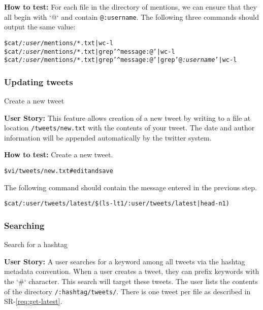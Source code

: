 \begin{Requirements}
\textbf{How to test:} For each file in the directory of mentions, we can ensure
that they all begin with `@` and contain \texttt{@:username}. The following
three commands should output the same value:

\begin{alltt}
    \$ cat /\textit{:user}/mentions/*.txt | wc -l
    \$ cat /\textit{:user}/mentions/*.txt | grep '^message:@' | wc -l
    \$ cat /\textit{:user}/mentions/*.txt | grep '^message:@' | grep '@\textit{:username}' | wc -l
\end{alltt}

\subsubsection{Updating tweets}
\item Create a new tweet\label{req:create-tweet}

\textbf{User Story:} This feature allows creation of a new tweet by writing to a
file at location \texttt{/tweets/new.txt} with the contents of your tweet. The
date and author information will be appended automatically by the twitter
system.

\textbf{How to test:} Create a new tweet.

\begin{alltt}
    \$ vi /tweets/new.txt  # edit and save
\end{alltt}

The following command should contain the message entered in the previous step.

\begin{alltt}
    \$ cat \texttt{/:user/tweets/latest/}\$(ls -lt1 \texttt{/:user/tweets/latest} | head -n 1)
\end{alltt}


\subsubsection{Searching}
\item Search for a hashtag

\textbf{User Story:} A user searches for a keyword among all tweets via the
hashtag metadata convention. When a user creates a tweet, they can prefix
keywords with the `\#` character. This search will target these tweets. The user
lists the contents of the directory \texttt{/:hashtag/tweets/}. There is one
tweet per file as described in SR-\ref{req:get-latest}.


\end{Requirements}
